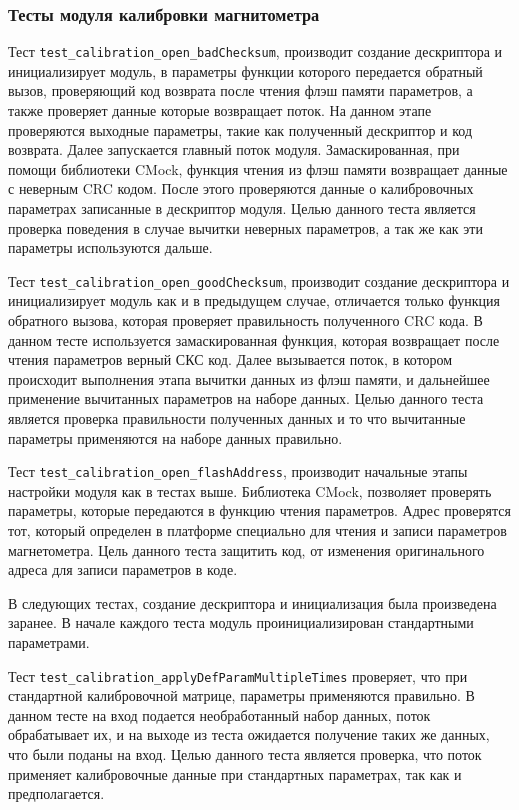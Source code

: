 \subsubsection{Тесты модуля калибровки магнитометра}

Тест \lstinline|test_calibration_open_badChecksum|, производит создание дескриптора
и инициализирует модуль, в параметры функции которого передается обратный вызов, проверяющий код возврата после чтения флэш памяти параметров, а
также проверяет данные которые возвращает поток.
На данном этапе проверяются выходные параметры, такие как полученный дескриптор и код возврата. 
Далее запускается главный поток модуля.
Замаскированная, при помощи библиотеки CMock, функция чтения из флэш памяти возвращает данные с неверным CRC кодом. После этого проверяются
данные о калибровочных параметрах записанные в дескриптор модуля. Целью данного теста является проверка поведения в случае вычитки неверных параметров,
а так же как эти параметры используются дальше.

Тест \lstinline|test_calibration_open_goodChecksum|, производит создание дескриптора и инициализирует модуль как и в предыдущем случае, отличается
только функция обратного вызова, которая проверяет правильность полученного CRC кода.
В данном тесте используется замаскированная функция, которая возвращает после чтения параметров верный СКС код. Далее вызывается поток, в котором происходит
выполнения этапа вычитки данных из флэш памяти, и дальнейшее применение вычитанных параметров на наборе данных. Целью данного теста является проверка
правильности полученных данных и то что вычитанные параметры применяются на наборе данных правильно.

Тест \lstinline|test_calibration_open_flashAddress|, производит начальные этапы настройки модуля как в тестах выше. Библиотека CMock, позволяет
проверять параметры, которые передаются в функцию чтения параметров. Адрес проверятся тот, который определен в платформе специально для чтения 
и записи параметров магнетометра. Цель данного теста защитить код, от изменения оригинального адреса для записи параметров в коде.

В следующих тестах, создание дескриптора и инициализация была произведена заранее. В начале каждого теста модуль проинициализирован стандартными параметрами.

Тест \lstinline|test_calibration_applyDefParamMultipleTimes| проверяет, что при стандартной калибровочной матрице, параметры применяются правильно. 
В данном тесте на вход подается необработанный набор данных, поток обрабатывает их, и на выходе из теста ожидается получение таких же данных, что были
поданы на вход. Целью данного теста является проверка, что поток применяет калибровочные данные при стандартных параметрах, так как и предполагается.

